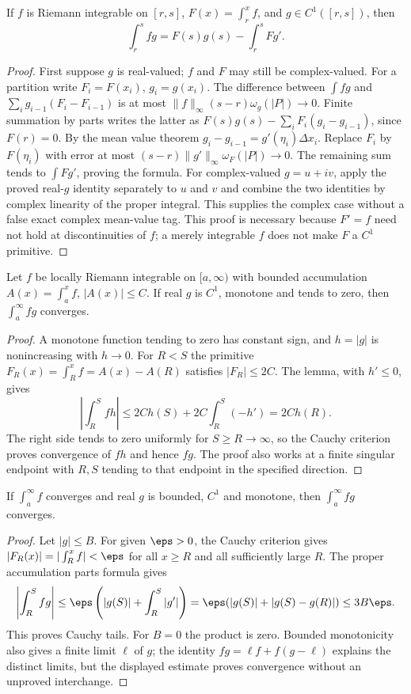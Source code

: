 \begin{lemma}
If $f$ is Riemann integrable on $[r,s]$, $F(x)=\int_r^xf$, and
$g\in C^1([r,s])$, then
\[\int_r^sfg=F(s)g(s)-\int_r^sFg'.
\]
\end{lemma}
\begin{proof}
First suppose $g$ is real-valued; $f$ and $F$ may still be complex-valued. For a partition write $F_i=F(x_i)$, $g_i=g(x_i)$.
The difference between $\int fg$ and
$\sum_i g_{i-1}(F_i-F_{i-1})$ is at most
$\|f\|_\infty(s-r)\omega_g(|P|)\to0$.
Finite summation by parts writes the latter as
$F(s)g(s)-\sum_iF_i(g_i-g_{i-1})$, since $F(r)=0$.
By the mean value theorem $g_i-g_{i-1}=g'(\eta_i)\Delta x_i$.
Replace $F_i$ by $F(\eta_i)$ with error at most
$(s-r)\|g'\|_\infty\omega_F(|P|)\to0$.
The remaining sum tends to $\int Fg'$, proving the formula.
For complex-valued $g=u+iv$, apply the proved real-$g$ identity separately to $u$ and $v$ and combine the two identities by complex linearity of the proper integral. This supplies the complex case without a false exact complex mean-value tag.
This proof is necessary because $F'=f$ need not hold at discontinuities
of $f$; a merely integrable $f$ does not make $F$ a $C^1$ primitive.
\end{proof}
\begin{theorem}
Let $f$ be locally Riemann integrable on $[a,\infty)$ with bounded
accumulation $A(x)=\int_a^xf$, $|A(x)|\le C$. If real $g$ is $C^1$,
monotone and tends to zero, then $\int_a^\infty fg$ converges.
\end{theorem}
\begin{proof}
A monotone function tending to zero has constant sign, and $h=|g|$
is nonincreasing with $h\to0$. For $R<S$ the primitive
$F_R(x)=\int_R^xf=A(x)-A(R)$ satisfies $|F_R|\le2C$.
The lemma, with $h'\le0$, gives
\[\left|\int_R^Sfh\right|
\le2Ch(S)+2C\int_R^S(-h')=2Ch(R).
\]
The right side tends to zero uniformly for $S\ge R\to\infty$,
so the Cauchy criterion proves convergence of $fh$ and hence $fg$.
The proof also works at a finite singular endpoint with $R,S$ tending
to that endpoint in the specified direction.
\end{proof}

\begin{theorem}
If $\int_a^\infty f$ converges and real $g$ is bounded, $C^1$ and
monotone, then $\int_a^\infty fg$ converges.
\end{theorem}
\begin{proof}
Let $|g|\le B$. For given $\eps>0$, the Cauchy criterion gives
$|F_R(x)|=|\int_R^xf|<\eps$ for all $x\ge R$ and all sufficiently
large $R$. The proper accumulation parts formula gives
\[\left|\int_R^Sfg\right|
\le\eps\left(|g(S)|+\int_R^S|g'|\right)
=\eps(|g(S)|+|g(S)-g(R)|)\le3B\eps.
\]
This proves Cauchy tails. For $B=0$ the product is zero.
Bounded monotonicity also gives a finite limit $\ell$ of $g$; the
identity $fg=\ell f+f(g-\ell)$ explains the distinct limits, but the
displayed estimate proves convergence without an unproved interchange.
\end{proof}

